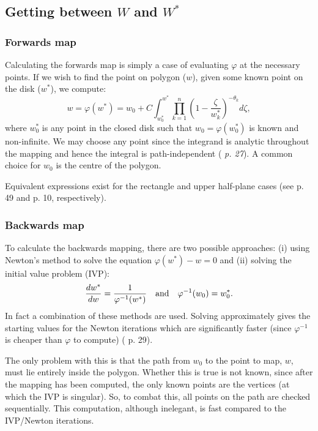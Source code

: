 \subsection{Getting between $W$ and $W^*$}

\subsubsection{Forwards map}

Calculating the forwards map is simply a case of evaluating $\varphi$ at the necessary points. If we wish to find the point on polygon ($w$), given some known point on the disk ($w^*$), we compute:
\begin{equation}
\label{forwardsmap}
w=\varphi(w^*) = w_0 + C \int_{w^*_0}^{w^*} \prod_{k=1}^{n} (1 - \frac{\zeta}{w^*_k})^{-\theta_k} d\zeta,
\end{equation}
where $w^*_0$ is any point in the closed disk such that $w_0 = \varphi(w^*_0)$ is known and non-infinite. We may choose any point since the integrand is analytic throughout the mapping and hence the integral is path-independent (\cite{driscoll} \emph{p. 27}). A common choice for $w_0$ is the centre of the polygon.

Equivalent expressions exist for the rectangle and upper half-plane cases (see \cite{driscoll} p. 49 and p. 10, respectively).

\subsubsection{Backwards map}

To calculate the backwards mapping, there are two possible approaches: (i) using Newton's method to solve the equation $\varphi(w^*)-w=0$ and (ii) solving the initial value problem (IVP):
\begin{equation}
\label{scivp}
\frac{dw^*}{dw}=\frac{1}{\varphi^{-1}(w^*)} \quad \text{and} \quad \varphi^{-1}(w_0)=w^*_0.
\end{equation}
In fact a combination of these methods are used. Solving  approximately gives the starting values for the Newton iterations which are significantly faster (since $\varphi^{-1}$ is cheaper than $\varphi$ to compute) (\cite{driscoll} p. 29).

The only problem with this is that the path from $w_0$ to the point to map, $w$, must lie entirely inside the polygon. Whether this is true is not known, since after the mapping has been computed, the only known points are the vertices (at which the IVP is singular). So, to combat this, all points on the path are checked sequentially. This computation, although inelegant, is fast compared to the IVP/Newton iterations.

